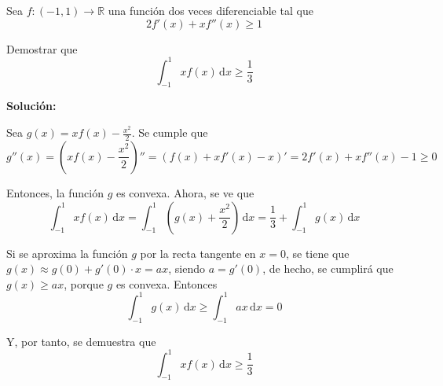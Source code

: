 \documentclass[../../main.tex]{subfiles}
\begin{document}
  \begin{shaded}
    Sea $f: (-1, 1) \to \mathbb{R}$ una función dos veces diferenciable tal que
    $$
    2 f'(x) + x f''(x) \geqslant 1
    $$

    Demostrar que
    $$
    \int_{-1}^1 x f(x) \, \text{d}x \geqslant \frac{1}{3}
    $$
  \end{shaded}

  \textbf{Solución:}

  Sea $g(x) = x f(x) - \displaystyle\frac{x^2}{2}$. Se cumple que
  $$
  g''(x) = \left(x f(x) - \frac{x^2}{2}\right)'' = \left(f(x) + x f'(x) - x\right)' = 2 f'(x) + x f''(x) - 1 \geqslant 0
  $$

  Entonces, la función $g$ es convexa. Ahora, se ve que
  $$
  \int_{-1}^1 x f(x) \, \text{d}x = \int_{-1}^1 \left(g(x) + \frac{x^2}{2}\right) \, \text{d}x = \frac{1}{3} + \int_{-1}^1 g(x) \, \text{d}x
  $$

  Si se aproxima la función $g$ por la recta tangente en $x = 0$, se tiene que $g(x) \approx g(0) + g'(0) \cdot x = a x$, siendo $a = g'(0)$, de hecho, se cumplirá que $g(x) \geqslant a x$, porque $g$ es convexa. Entonces
  $$
  \int_{-1}^1 g(x) \, \text{d}x \geqslant \int_{-1}^1 a x \, \text{d}x = 0
  $$

  Y, por tanto, se demuestra que
  $$
  \int_{-1}^1 x f(x) \, \text{d}x \geqslant \frac{1}{3}
  $$
\end{document}
